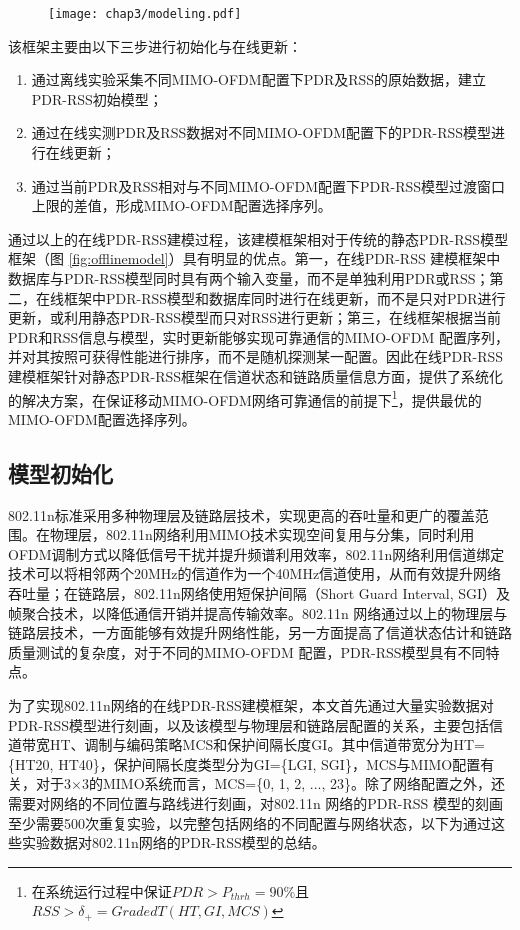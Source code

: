 \begin{figure}[!htp]
\centering
\texttt{[image: chap3/modeling.pdf]}
\end{figure}

该框架主要由以下三步进行初始化与在线更新：
\begin{enumerate}
  \item 通过离线实验采集不同MIMO-OFDM配置下PDR及RSS的原始数据，建立PDR-RSS初始模型；
  \item 通过在线实测PDR及RSS数据对不同MIMO-OFDM配置下的PDR-RSS模型进行在线更新；
  \item 通过当前PDR及RSS相对与不同MIMO-OFDM配置下PDR-RSS模型过渡窗口上限的差值，形成MIMO-OFDM配置选择序列。
\end{enumerate}

通过以上的在线PDR-RSS建模过程，该建模框架相对于传统的静态PDR-RSS模型框架（图 \ref{fig:offlinemodel}）具有明显的优点。第一，在线PDR-RSS 建模框架中数据库与PDR-RSS模型同时具有两个输入变量，而不是单独利用PDR或RSS；第二，在线框架中PDR-RSS模型和数据库同时进行在线更新，而不是只对PDR进行更新，或利用静态PDR-RSS模型而只对RSS进行更新；第三，在线框架根据当前PDR和RSS信息与模型，实时更新能够实现可靠通信的MIMO-OFDM 配置序列，并对其按照可获得性能进行排序，而不是随机探测某一配置。因此在线PDR-RSS建模框架针对静态PDR-RSS框架在信道状态和链路质量信息方面，提供了系统化的解决方案，在保证移动MIMO-OFDM网络可靠通信的前提下\footnote{在系统运行过程中保证$PDR>P_{thrh}=90\%$且$RSS>\delta_+=GradedT(HT, GI, MCS)$}，提供最优的MIMO-OFDM配置选择序列。


\subsection{模型初始化}
\label{sec:initial}

802.11n标准采用多种物理层及链路层技术，实现更高的吞吐量和更广的覆盖范围。在物理层，802.11n网络利用MIMO技术实现空间复用与分集，同时利用OFDM调制方式以降低信号干扰并提升频谱利用效率，802.11n网络利用信道绑定技术可以将相邻两个20MHz的信道作为一个40MHz信道使用，从而有效提升网络吞吐量；在链路层，802.11n网络使用短保护间隔（Short Guard Interval, SGI）及帧聚合技术，以降低通信开销并提高传输效率。802.11n 网络通过以上的物理层与链路层技术，一方面能够有效提升网络性能，另一方面提高了信道状态估计和链路质量测试的复杂度，对于不同的MIMO-OFDM 配置，PDR-RSS模型具有不同特点。

为了实现802.11n网络的在线PDR-RSS建模框架，本文首先通过大量实验数据对PDR-RSS模型进行刻画，以及该模型与物理层和链路层配置的关系，主要包括信道带宽HT、调制与编码策略MCS和保护间隔长度GI。其中信道带宽分为HT=\{HT20, HT40\}，保护间隔长度类型分为GI=\{LGI, SGI\}，MCS与MIMO配置有关，对于3$\times$3的MIMO系统而言，MCS=\{0, 1, 2, ..., 23\}。除了网络配置之外，还需要对网络的不同位置与路线进行刻画，对802.11n 网络的PDR-RSS 模型的刻画至少需要500次重复实验，以完整包括网络的不同配置与网络状态，以下为通过这些实验数据对802.11n网络的PDR-RSS模型的总结。


